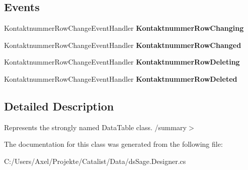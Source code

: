 \subsection*{Events}
\begin{DoxyCompactItemize}
\item 
Kontaktnummer\+Row\+Change\+Event\+Handler {\bfseries Kontaktnummer\+Row\+Changing}\hypertarget{class_products_1_1_data_1_1ds_sage_1_1_kontaktnummer_data_table_a9c5d90b459d40a2259ab264329eefa12}{}\label{class_products_1_1_data_1_1ds_sage_1_1_kontaktnummer_data_table_a9c5d90b459d40a2259ab264329eefa12}

\item 
Kontaktnummer\+Row\+Change\+Event\+Handler {\bfseries Kontaktnummer\+Row\+Changed}\hypertarget{class_products_1_1_data_1_1ds_sage_1_1_kontaktnummer_data_table_ae51942c11542dd42617a225b22dbb413}{}\label{class_products_1_1_data_1_1ds_sage_1_1_kontaktnummer_data_table_ae51942c11542dd42617a225b22dbb413}

\item 
Kontaktnummer\+Row\+Change\+Event\+Handler {\bfseries Kontaktnummer\+Row\+Deleting}\hypertarget{class_products_1_1_data_1_1ds_sage_1_1_kontaktnummer_data_table_a372259504e5cfa3b6f79eac609a4bc91}{}\label{class_products_1_1_data_1_1ds_sage_1_1_kontaktnummer_data_table_a372259504e5cfa3b6f79eac609a4bc91}

\item 
Kontaktnummer\+Row\+Change\+Event\+Handler {\bfseries Kontaktnummer\+Row\+Deleted}\hypertarget{class_products_1_1_data_1_1ds_sage_1_1_kontaktnummer_data_table_a0c10a330da853cd0ea40ca26c915e148}{}\label{class_products_1_1_data_1_1ds_sage_1_1_kontaktnummer_data_table_a0c10a330da853cd0ea40ca26c915e148}

\end{DoxyCompactItemize}


\subsection{Detailed Description}
Represents the strongly named Data\+Table class. /summary$>$ 

The documentation for this class was generated from the following file\+:\begin{DoxyCompactItemize}
\item 
C\+:/\+Users/\+Axel/\+Projekte/\+Catalist/\+Data/ds\+Sage.\+Designer.\+cs\end{DoxyCompactItemize}
